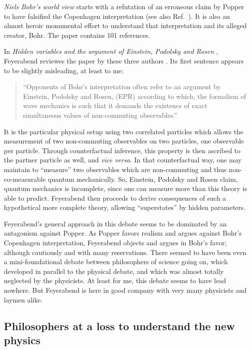 \documentclass{article}
\begin{document}
{\em {N}iels {B}ohr's world view} \cite{fey-papers1-Bohr} starts with
a refutation of an erroneous claim by Popper to have falsified the Copenhagen interpretation
(see also Ref.~\cite{2002-peres}).
It is also an almost heroic monumental effort to understand that interpretation and its
alleged creator, Bohr.
The paper contains 101 references.

In {\em Hidden variables and the argument of {E}instein, {P}odolsky and {R}osen} \cite{fey-papers1-EPR},
Feyerabend reviewes the paper by these three authors \cite{epr}.
Its first sentence appears to be slightly misleading, at least to me:
\begin{quote}
{ ``Opponents of Bohr's interpretation often refer to an argument by
{E}instein, {P}odolsky and {R}osen, (EPR) according to which,
the formalism of wave mechanics is such that it demands the existence of
exact simultaneous values of non-commuting observables.''}
\end{quote}
It is the particular physical setup using two correlated particles
which allows the measurement of two non-commuting observables on two particles,
one observable per particle.
Through counterfactual inference,
this property is then ascribed to the partner particle as well, and {\em vice versa}.
In that counterfactual way, one may maintain to ``measure'' two observables
which are non-commuting and thus non-co-measurable quantum mechanically.
So, {E}instein, {P}odolsky and {R}osen claim, quantum mechanics is incomplete, since one
can measure more than this theory is able to predict.
Feyerabend then proceeds to derive consequences of such a hypothetical more complete
theory, allowing ``superstates'' by hidden parameters.

Feyerabend's general approach in this debate seems to be dominated by an antagonism
against Popper.
As Popper favors realism and argues against Bohr's Copenhagen interpretation,
Feyerabend objects and argues in Bohr's favor;
although cautiously and with many reservations.
There seemed to have been even a mini-foundational debate between philosophers
of science going on, which developed in parallel to
the physical debate, and which was almost totally neglected by the physicists.
At least for me, this debate seems to have lead nowhere.
But Feyerabend is here in good company with very many physicists and laymen alike.



\subsection{Philosophers at a loss to understand the new physics}
\end{document}
